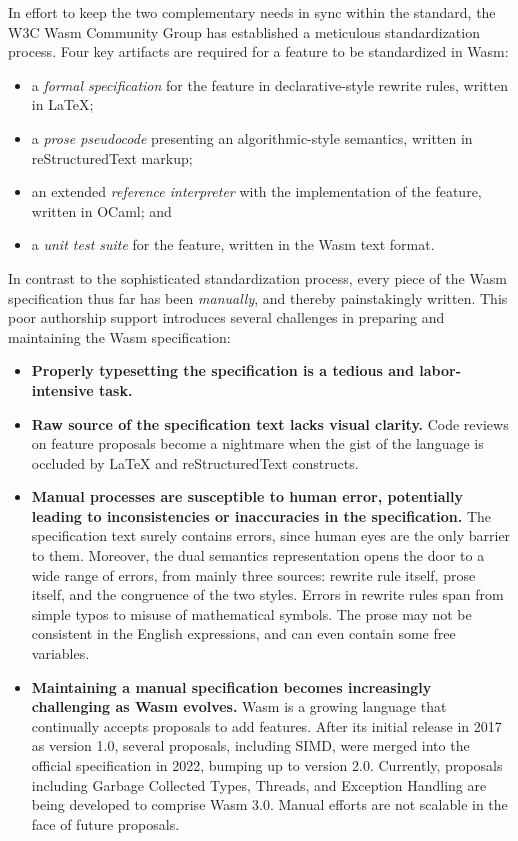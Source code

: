 In effort to keep the two complementary needs in sync within the standard, the W3C Wasm Community Group has established a meticulous standardization process. 
Four key artifacts are required for a feature to be standardized in Wasm:
\begin{itemize}
  \item a \textit{formal specification} for the feature in declarative-style rewrite rules, written in LaTeX;
  \item a \textit{prose pseudocode} presenting an algorithmic-style semantics, written in reStructuredText markup;
  \item an extended \textit{reference interpreter} with the implementation of the feature, written in OCaml; and
  \item a \textit{unit test suite} for the feature, written in the Wasm text format.
\end{itemize}

In contrast to the sophisticated standardization process, every piece of the Wasm specification thus far has been \textit{manually}, and thereby painstakingly written. 
This poor authorship support introduces several challenges in preparing and maintaining the Wasm specification:
\begin{itemize}
  \item 
    \textbf{Properly typesetting the specification is a tedious and labor-intensive task.} 
  \item
    \textbf{Raw source of the specification text lacks visual clarity.} 
    Code reviews on feature proposals become a nightmare when the gist of the language is occluded by LaTeX and reStructuredText constructs. 
  \item 
    \textbf{Manual processes are susceptible to human error, potentially leading to inconsistencies or inaccuracies in the specification.} 
    The specification text surely contains errors, since human eyes are the only barrier to them. 
    Moreover, the dual semantics representation opens the door to a wide range of errors, from mainly three sources: rewrite rule itself, prose itself, and the congruence of the two styles.
    Errors in rewrite rules span from simple typos to misuse of mathematical symbols. 
    The prose may not be consistent in the English expressions, and can even contain some free variables. 
  \item 
    \textbf{Maintaining a manual specification becomes increasingly challenging as Wasm evolves.} 
    Wasm is a growing language that continually accepts proposals to add features. 
    After its initial release in 2017 as version 1.0, several proposals, including SIMD, were merged into the official specification in 2022, bumping up to version 2.0. 
    Currently, proposals including Garbage Collected Types, Threads, and Exception Handling are being developed to comprise Wasm 3.0. 
    Manual efforts are not scalable in the face of future proposals.
\end{itemize}

